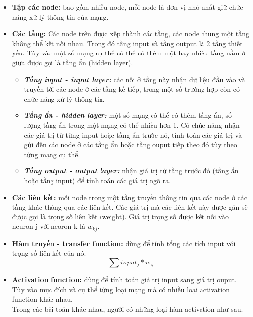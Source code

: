 	\begin{itemize}
		\item \textbf{Tập các node:} bao gồm nhiều node, mỗi node là đơn vị nhỏ nhất giữ chức năng xử lý thông tin của mạng.
		\item \textbf{Các tầng:} Các node trên được xếp thành các tầng, các node chung một tầng không thể kết nối nhau. Trong đó tầng input và tầng output là 2 tầng thiết yếu. Tùy vào một số mạng cụ thể có thể có thêm một hay nhiêu tầng nằm ở giữa được gọi là tầng ẩn (hidden layer).
		\begin{itemize}
			\item \textbf{\textit{Tầng input - input layer: }}các nối ở tầng này nhận dữ liệu đầu vào và truyền tới các node ở các tầng kế tiếp, trong một số trường hợp còn có chức năng xử lý thông tin.
			\item \textbf{\textit{Tầng ẩn - hidden layer: }}một số mạng có thể có thêm tầng ẩn, số lượng tầng ẩn trong một mạng có thể nhiều hơn 1. Có chức năng nhận các giá trị từ từng input hoặc tầng ẩn trước nó, tính toán các giá trị và gửi đến các node ở các tầng ẩn hoặc tầng ouput tiếp theo đó tùy theo từng mạng cụ thể.
			\item \textbf{\textit{Tầng output - output layer: }}nhận giá trị từ tầng trước đó (tầng ẩn hoặc tầng input) để tính toán các giá trị ngõ ra.
		\end{itemize}
		\item \textbf{Các liên kết:} mỗi node trong một tầng truyền thông tin qua các node ở các tầng khác thông qua các liên kết. Các giá trị mà các liên kết này được gán sẽ được gọi là trọng số liên kết (weight). Giá trị trọng số được kết nối vào neuron j với neoron k là \(w_{kj}\).
		\item \textbf{Hàm truyền - transfer function: }dùng để tính tổng các tích input với trọng số liên kết của nó. \[ \sum input_j*w_{ij}\]
		
		\item \textbf{Activation function: }dùng để tính toán giá trị input sang giá trị ouput. Tùy vào mục đích và cụ thể từng loại mạng mà có nhiều loại activation function khác nhau.\\
		Trong các bài toán khác nhau, người có những loại hàm activation như sau.
		

\end{itemize}
